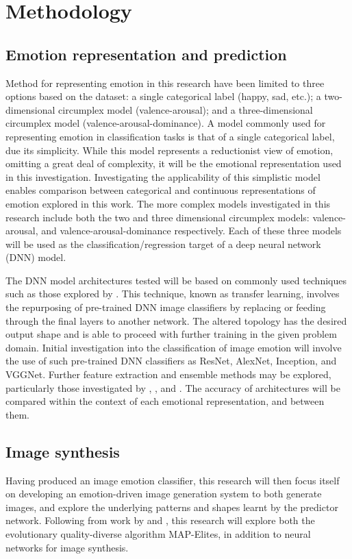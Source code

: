 \documentclass{article}
\begin{document}
\section{Methodology}

\subsection{Emotion representation and prediction}
Method for representing emotion in this research have been limited to three options based on the dataset: a single categorical label (happy, sad, etc.); a two-dimensional circumplex model (valence-arousal); and a three-dimensional circumplex model (valence-arousal-dominance).
A model commonly used for representing emotion in classification tasks is that of a single categorical label, due its simplicity.
While this model represents a reductionist view of emotion, omitting a great deal of complexity, it will be the emotional representation used in this investigation.
Investigating the applicability of this simplistic model enables comparison between categorical and continuous representations of emotion explored in this work.
The more complex models investigated in this research include both the two and three dimensional circumplex models: valence-arousal, and valence-arousal-dominance respectively.
Each of these three models will be used as the classification/regression target of a deep neural network (DNN) model.

The DNN model architectures tested will be based on commonly used techniques such as those explored by \citet{kim2018building, chen2015learning}.
This technique, known as transfer learning, involves the repurposing of pre-trained DNN image classifiers by replacing or feeding through the final layers to another network.
The altered topology has the desired output shape and is able to proceed with further training in the given problem domain.
Initial investigation into the classification of image emotion will involve the use of such pre-trained DNN classifiers as ResNet, AlexNet, Inception, and VGGNet.
Further feature extraction and ensemble methods may be explored, particularly those investigated by \citet{kim2018building}, \citet{chen2015learning}, and \citet{chen2015learning}.
The accuracy of architectures will be compared within the context of each emotional representation, and between them.

\subsection{Image synthesis}
Having produced an image emotion classifier, this research will then focus itself on developing an emotion-driven image generation system to both generate images, and explore the underlying patterns and shapes learnt by the predictor network.
Following from work by \citet{nguyen2015innovation} and \citet{tan2017artgan}, this research will explore both the evolutionary quality-diverse algorithm MAP-Elites, in addition to neural networks for image synthesis.
\end{document}
